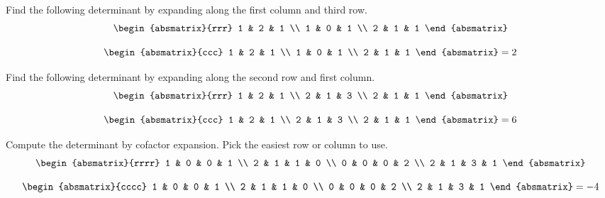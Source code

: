 \begin{enumialphparenastyle}
\begin{ex} Find the following determinant by expanding along the first column and
third row. 
\begin{equation*}
\begin{absmatrix}{rrr}
1 & 2 & 1 \\
1 & 0 & 1 \\
2 & 1 & 1
\end{absmatrix}
\end{equation*}
\begin{sol}
\begin{equation*}
\begin{absmatrix}{ccc}
1 & 2 & 1 \\
1 & 0 & 1 \\
2 & 1 & 1
\end{absmatrix} =  2
\end{equation*}
\end{sol}
\end{ex}

\begin{ex} Find the following determinant by expanding along the second row and
first column. 
\begin{equation*}
\begin{absmatrix}{rrr}
1 & 2 & 1 \\
2 & 1 & 3 \\
2 & 1 & 1
\end{absmatrix}
\end{equation*}
\begin{sol}
\begin{equation*}
\begin{absmatrix}{ccc}
1 & 2 & 1 \\
2 & 1 & 3 \\
2 & 1 & 1
\end{absmatrix} = 6
\end{equation*}
\end{sol}
\end{ex}

\begin{ex} Compute the determinant by cofactor expansion. Pick the easiest row or
column to use.
\begin{equation*}
\begin{absmatrix}{rrrr}
1 & 0 & 0 & 1 \\
2 & 1 & 1 & 0 \\
0 & 0 & 0 & 2 \\
2 & 1 & 3 & 1
\end{absmatrix}
\end{equation*}
\begin{sol}
\begin{equation*}
\begin{absmatrix}{cccc}
1 & 0 & 0 & 1 \\
2 & 1 & 1 & 0 \\
0 & 0 & 0 & 2 \\
2 & 1 & 3 & 1
\end{absmatrix} = -4
\end{equation*}
\end{sol}
\end{ex}

\end{enumialphparenastyle}
